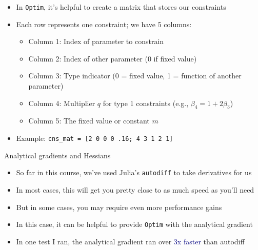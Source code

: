 \documentclass[aspectratio=169]{beamer}
\begin{document}
\begin{frame}

\begin{itemize}
\itemsep1.5em
\item<1-> In \texttt{Optim}, it's helpful to create a matrix that stores our constraints
\item<2-> Each row represents one constraint; we have 5 columns:
\bigskip\par
\begin{itemize}
\itemsep1.5em
\item<3-> Column 1: Index of parameter to constrain
\item<4-> Column 2: Index of other parameter (0 if fixed value)
\item<5-> Column 3: Type indicator (0 = fixed value, 1 = function of another parameter)
\item<6-> Column 4: Multiplier $q$ for type 1 constraints (e.g., $\beta_4 = 1 + 2\beta_3$)
\item<7-> Column 5: The fixed value or constant $m$
\end{itemize}
\item<8-> Example: \texttt{cns\_mat = [2 0 0 0 .16; 4 3 1 2 1]}
\end{itemize}

\end{frame}

\begin{frame}

Analytical gradients and Hessians

\bigskip{}

\begin{itemize}
\itemsep1.5em
\item<2-> So far in this course, we've used Julia's \texttt{autodiff} to take derivatives for us
\item<3-> In most cases, this will get you pretty close to as much speed as you'll need
\item<4-> But in some cases, you may require even more performance gains
\item<5-> In this case, it can be helpful to provide \texttt{Optim} with the analytical gradient
\item<6-> In one test I ran, the analytical gradient ran over \textcolor{navy}{3x faster} than autodiff
\end{itemize}

\end{frame}
\end{document}
